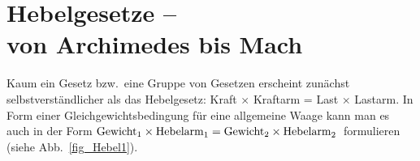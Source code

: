 

\chapter{Hebelgesetze --\\von Archimedes bis Mach}
\label{chap_Hebel}

Kaum ein Gesetz bzw.\ eine Gruppe von Gesetzen erscheint zun\"achst
selbstverst\"andlicher als das Hebelgesetz: Kraft $\times$ Kraftarm = Last $\times$ Lastarm.
In Form einer Gleichgewichtsbedingung f\"ur eine allgemeine Waage kann man
es auch in der Form \glqq ${\rm Gewicht_1\times Hebelarm}_1= {\rm Gewicht_2\times Hebelarm}_2$\grqq\
formulieren (siehe Abb.\ \ref{fig_Hebel1}).

